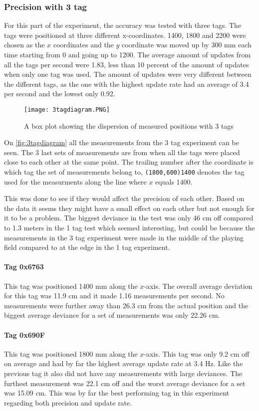 \subsubsection{Precision with 3 tag}
For this part of the experiment, the accuracy was tested with three tags.
The tags were positioned at three different x-coordinates.
1400, 1800 and 2200 were chosen as the $x$ coordinates and the $y$ coordinate was moved up by 300 mm each time starting from 0 and going up to 1200.
The average amount of updates from all the tags per second were 1.83, less than 10 percent of the amount of updates when only one tag was used.
The amount of updates were very different between the different tags, as the one with the highest update rate had an average of 3.4 per second and the lowest only 0.92.
\begin{figure}[H]
    \centering
    \texttt{[image: 3tagdiagram.PNG]}
    \caption{A box plot showing the dispersion of measured positions with 3 tags}
    \label{fig:3tagdiagram}
\end{figure}
\noindent
On \autoref{fig:3tagdiagram} all the measurements from the 3 tag experiment can be seen.
The 3 last sets of measurements are from when all the tags were placed close to each other at the same point.
The trailing number after the coordinate is which tag the set of measurements belong to, \texttt{(1800,600)1400} denotes the tag used for the measurments along the line where $x$ equals 1400.

This was done to see if they would affect the precision of each other.
Based on the data it seems they might have a small effect on each other but not enough for it to be a problem.
The biggest deviance in the test was only 46 cm off compared to 1.3 meters in the 1 tag test which seemed interesting, but could be because the measurements in the 3 tag experiment were made in the middle of the playing field compared to at the edge in the 1 tag experiment.

\paragraph{Tag 0x6763}
This tag was positioned 1400 mm along the $x$-axis.
The overall average deviation for this tag was 11.9 cm and it made 1.16 measurements per second.
No measurements were further away than 26.3 cm from the actual position and the biggest average deviance for a set of measurements was only 22.26 cm.


\paragraph{Tag 0x690F}
This tag was positioned 1800 mm along the $x$-axis.
This tag was only 9.2 cm off on average and had by far the highest average update rate at 3.4 Hz.
Like the previous tag it also did not have any measurements with large deviances.
The furthest measurement was 22.1 cm off and the worst average deviance for a set was 15.09 cm.
This was by far the best performing tag in this experiment regarding both precision and update rate.

